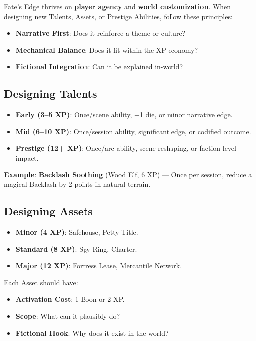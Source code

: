Fate’s Edge thrives on \textbf{player agency} and \textbf{world customization}. When designing new Talents, Assets, or Prestige Abilities, follow these principles:

\begin{itemize}
    \item \textbf{Narrative First}: Does it reinforce a theme or culture?
    \item \textbf{Mechanical Balance}: Does it fit within the XP economy?
    \item \textbf{Fictional Integration}: Can it be explained in-world?
\end{itemize}

\subsection*{Designing Talents}

\begin{itemize}
    \item \textbf{Early (3–5 XP)}: Once/scene ability, +1 die, or minor narrative edge.
    \item \textbf{Mid (6–10 XP)}: Once/session ability, significant edge, or codified outcome.
    \item \textbf{Prestige (12+ XP)}: Once/arc ability, scene-reshaping, or faction-level impact.
\end{itemize}

\textbf{Example}: \textbf{Backlash Soothing} (Wood Elf, 6 XP) — Once per session, reduce a magical Backlash by 2 points in natural terrain.

\subsection*{Designing Assets}

\begin{itemize}
    \item \textbf{Minor (4 XP)}: Safehouse, Petty Title.
    \item \textbf{Standard (8 XP)}: Spy Ring, Charter.
    \item \textbf{Major (12 XP)}: Fortress Lease, Mercantile Network.
\end{itemize}

Each Asset should have:
\begin{itemize}
    \item \textbf{Activation Cost}: 1 Boon or 2 XP.
    \item \textbf{Scope}: What can it plausibly do?
    \item \textbf{Fictional Hook}: Why does it exist in the world?
\end{itemize}

